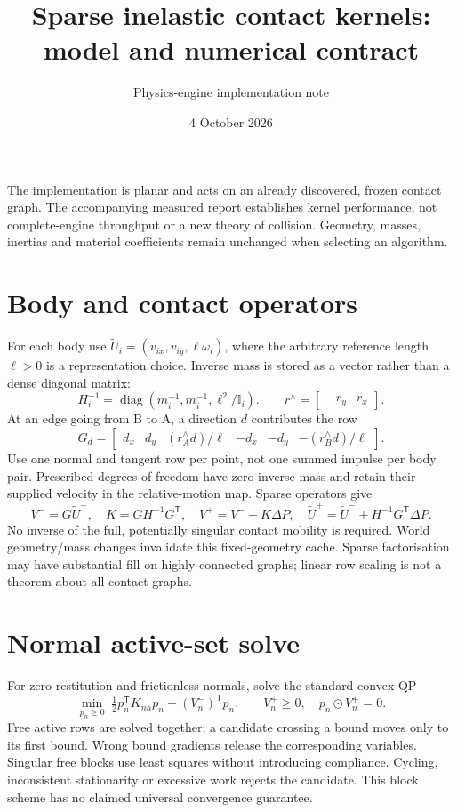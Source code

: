 \documentclass[11pt]{article}
\title{Sparse inelastic contact kernels: model and numerical contract}
\author{Physics-engine implementation note}
\date{4 October 2026}
\begin{document}
\maketitle
\noindent The implementation is planar and acts on an already discovered, frozen
contact graph. The accompanying measured report establishes kernel performance,
not complete-engine throughput or a new theory of collision. Geometry, masses,
inertias and material coefficients remain unchanged when selecting an algorithm.

\section{Body and contact operators}
For each body use $\widetilde U_i=(v_{ix},v_{iy},\ell\omega_i)$, where the
arbitrary reference length $\ell>0$ is a representation choice. Inverse mass is
stored as a vector rather than a dense diagonal matrix:
\begin{equation}
 H_i^{-1}=\operatorname{diag}(m_i^{-1},m_i^{-1},\ell^2/\mathbb I_i).
 \qquad r^{\wedge}=\begin{bmatrix}-r_y&r_x\end{bmatrix}.
\end{equation}
At an edge going from B to A, a direction $d$ contributes the row
\begin{equation}
 G_d=\begin{bmatrix}
 d_x&d_y&(r_A^{\wedge}d)/\ell&
 -d_x&-d_y&-(r_B^{\wedge}d)/\ell
 \end{bmatrix}.
\end{equation}
Use one normal and tangent row per point, not one summed impulse per body pair.
Prescribed degrees of freedom have zero inverse mass and retain their supplied
velocity in the relative-motion map. Sparse operators give
\begin{equation}
 V^-=G\widetilde U^-,\quad K=G H^{-1}G^{\mathsf T},\quad
 V^+=V^-+K\Delta P,\quad
 \widetilde U^+=\widetilde U^-+H^{-1}G^{\mathsf T}\Delta P.
\end{equation}
No inverse of the full, potentially singular contact mobility is required.
World geometry/mass changes invalidate this fixed-geometry cache. Sparse
factorisation may have substantial fill on highly connected graphs; linear row
scaling is not a theorem about all contact graphs.

\section{Normal active-set solve}
For zero restitution and frictionless normals, solve the standard convex QP
\begin{equation}
 \min_{p_n\geq0}\;\tfrac12p_n^{\mathsf T}K_{nn}p_n
       +(V_n^-)^{\mathsf T}p_n.
 \qquad V_n^+\geq0,\quad p_n\odot V_n^+=0.
\end{equation}
Free active rows are solved together; a candidate crossing a bound moves only
to its first bound. Wrong bound gradients release the corresponding variables.
Singular free blocks use least squares without introducing compliance. Cycling,
inconsistent stationarity or excessive work rejects the candidate. This block
scheme has no claimed universal convergence guarantee.
\end{document}
